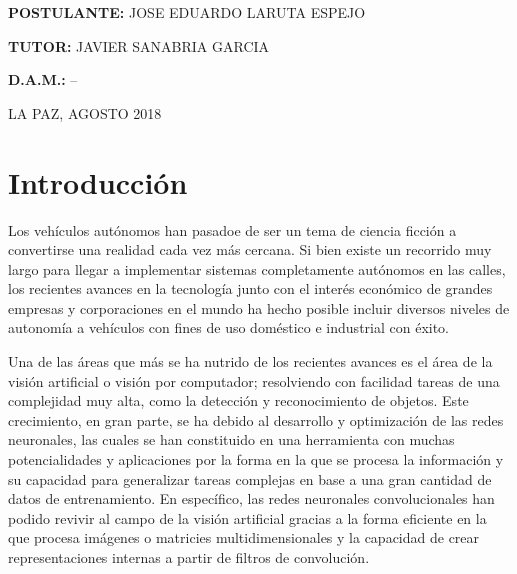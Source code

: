 \documentclass[12pt,letterpaper]{article}
\begin{document}
\begin{titlepage}
\begin{center}
\vspace*{0.2in}


\begin{large}
\textbf{POSTULANTE:} JOSE EDUARDO LARUTA ESPEJO\\
\end{large}

\begin{large}
\hspace{0.08in} \textbf{TUTOR:} JAVIER SANABRIA GARCIA\\
\end{large}

\begin{large}
\hspace{0.44in} \textbf{D.A.M.:} --\\
\end{large}

\vspace*{0.2in}



\begin{normalsize}
LA PAZ, AGOSTO 2018\\
\end{normalsize}
\end{center}
\end{titlepage}


\thispagestyle{empty}
\tableofcontents
\newpage



\section{Introducción}

Los vehículos autónomos han pasadoe de ser un tema de ciencia ficción a convertirse una realidad cada vez más 
cercana. Si bien existe un recorrido muy largo para llegar a implementar sistemas completamente autónomos en las calles, 
los recientes avances en la tecnología junto con el interés económico de grandes empresas y corporaciones en el mundo 
ha hecho posible incluir diversos niveles de autonomía a vehículos con fines de uso doméstico e industrial con éxito.

Una de las áreas que más se ha nutrido de los recientes avances es el área de la visión artificial o visión por computador; 
resolviendo con facilidad tareas de una complejidad muy alta, como la detección y reconocimiento de objetos. 
Este crecimiento, en gran parte, se ha debido al desarrollo y optimización de las redes neuronales, las cuales se han 
constituido en una herramienta con muchas potencialidades y aplicaciones por la forma en la que se procesa la información 
y su capacidad para generalizar tareas complejas en base a una gran cantidad de datos de entrenamiento. En específico, 
las redes neuronales convolucionales han podido revivir al campo de la visión artificial gracias a la forma eficiente 
en la que procesa imágenes o matricies multidimensionales y la capacidad de crear representaciones internas a partir 
de filtros de convolución.
\end{document}
